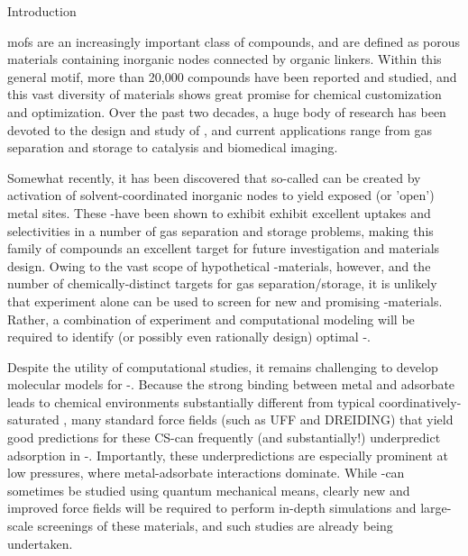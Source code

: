 \begin{section}{Introduction}

\Glspl{mof} are an increasingly important class of compounds, and are
defined as porous
materials containing inorganic nodes connected by organic linkers. Within
this general motif, more than 20,000 compounds have been reported and
studied,\cite{Furukawa2013} and this vast diversity of \mof materials shows great promise
for chemical customization and optimization. Over the past two decades, a
huge body of research has been devoted to the design and study of \mofs, and
current applications range from gas separation and storage to catalysis and
biomedical imaging.\cite{Furukawa2013}

Somewhat recently, it has been discovered that so-called \cus \mofs can be
created by activation of solvent-coordinated inorganic nodes to yield exposed
(or 'open') metal sites.\cite{Millward2005b,Dietzel2009,Dzubak2012} These \cus-\mofs have
been shown to exhibit exhibit excellent uptakes and selectivities in a number
of gas separation and storage problems,\cite{Czaja2009,Millward2005b,Dietzel2009}
making this family of compounds an excellent target for future
investigation and materials design. Owing to the vast scope of hypothetical
\cus-\mof materials, however, and the number of chemically-distinct targets
for gas separation/storage, it is unlikely that experiment alone can
be used to screen for new and promising \cus-\mof materials.\cite{Krishna2011} 
Rather, a combination of
experiment and computational modeling will be required to identify (or possibly
even rationally design) optimal \cus-\mofs.\cite{Getman2012,Czaja2009,Krishna2011}

Despite the utility of computational studies, it remains challenging to
develop molecular models for
\cus-\mofs.\cite{Dzubak2012,Krishna2011,Getman2012} Because the strong binding
between metal and adsorbate leads to chemical environments substantially
different from typical coordinatively-saturated \mofs, many standard force
fields (such as UFF and DREIDING) that yield good predictions for these
CS-\mofs can frequently (and substantially!) underpredict adsorption in
\cus-\mofs.\cite{Yazaydin2009,Krishna2011,Getman2012} Importantly, these
underpredictions are especially prominent at low pressures, where
metal-adsorbate interactions
dominate.\cite{Yazaydin2009,Krishna2011,Getman2012} While \cus-\mofs can
sometimes be studied using quantum mechanical
means,\cite{Getman2012,Valenzano2010,Poloni2014} clearly new and improved
force fields will be required to perform in-depth simulations and large-scale
screenings of these materials, and such studies are already being
undertaken.\cite{Lin2014,Haldoupis2015,Mercado2016,Becker2017}


\end{section}
